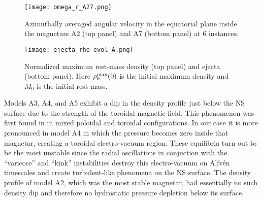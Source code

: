 \documentclass[twocolumn,superscriptaddress,showpacs,prl,aps,amsmath,amssymb,nofootinbib]{revtex4-1}
\begin{document}
\begin{figure} 
\begin{center}
\texttt{[image: omega\_r\_A27.png]}
\caption{Azimuthally averaged angular velocity in the equatorial plane inside the magnetars A2 (top panel) 
and A7 (bottom panel) at 6 instances.}
\label{fig:omega_A27}
\end{center}
\end{figure}

\begin{figure} 
\begin{center}
\texttt{[image: ejecta\_rho\_evol\_A.png]}
\caption{Normalized maximum rest-mass density (top panel) and ejecta (bottom panel). Here 
$\rho_0^{\rm max}(0)$ is the initial maximum density and $M_0$ is the initial rest mass.}
\label{fig:rho_ej}
\end{center}
\end{figure}

Models A3, A4, and A5 exhibit a dip in the density profile just below the
NS surface due to the strength of the toroidal magnetic field. This
phenomenon was first found in \cite{Uryu:2019ckz} in mixed poloidal and
toroidal configurations. In our case it is more pronounced in model A4 in
which the pressure becomes zero inside that magnetar, creating a toroidal
electro-vacuum region. These equilibria turn out to be the most unstable since
the radial oscillations in conjuction with the ``varicose'' and ``kink''
instabilities destroy this electro-vacuum on Alfv\'en timescales and create
turbulent-like phenomena on the NS surface. The density profile of
model A2, which was the most stable magnetar, had essentially no such density
dip and therefore no hydrostatic pressure depletion below its surface.
\end{document}
